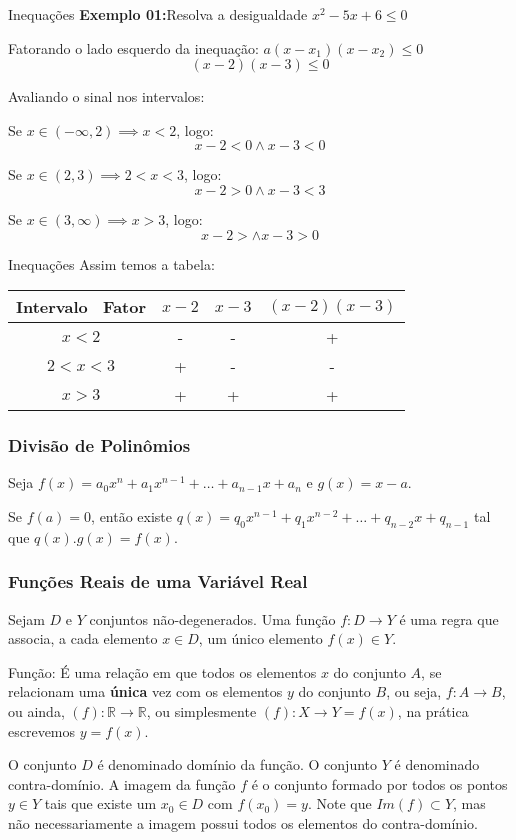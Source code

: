 \documentclass[hyperref={pdfpagelabels=false}]{beamer}
\begin{document}
\begin{frame}{Inequações}
 \textbf{Exemplo 01:}Resolva a desigualdade $x^{2} - 5x + 6 \leq 0$ \pause
 
 Fatorando o lado esquerdo da inequação: $a(x-x_1)(x-x_2) \leq 0$ 
$$(x-2)(x-3) \leq 0$$

Avaliando o sinal nos intervalos:

Se $x \in (-\infty,2) \implies x < 2$, logo:
$$x-2<0 \land x-3 < 0 $$

Se $x \in (2,3) \implies 2<x<3$, logo:
$$x-2 > 0 \land x-3 < 3$$

Se $x \in (3, \infty) \implies x > 3$, logo:
$$x - 2 > \land x - 3>0$$

\end{frame}

\begin{frame}{Inequações}
 Assim temos a tabela:
\begin{table}[h]
	\centering
	\begin{tabular}{|c|c|c|c|}
		\hline
		Intervalo \ Fator	&	$x-2$	&	$x-3$	&	$(x-2)(x-3)$ \\
		\hline
		$x<2$				&	-		&	-		&	+	\\
		\hline
		$2<x<3$				&	+		&	-		&	-	\\
		\hline
		$x>3$				&	+		&	+		&	+	\\
		\hline
	\end{tabular}
\end{table}
\end{frame}



\begin{frame}
\frametitle{Divisão de Polinômios}

Seja $f(x) = a_0x^n+a_1x^{n-1}+\dots+a_{n-1}x+a_n$ e $g(x)=x-a$. 

Se $f(a)=0$, então existe $q(x)=q_0x^{n-1}+q_1x^{n-2}+\dots+q_{n-2}x+q_{n-1}$ tal que $q(x).g(x)=f(x)$.


\end{frame}

\begin{frame}
\frametitle{Funções Reais de uma Variável Real}

Sejam $D$ e $Y$ conjuntos não-degenerados. Uma função $f:D \rightarrow Y$ é uma regra que associa, a cada elemento $x \in D$, um único elemento $f(x) \in Y$. \pause

Função: \pause É uma relação em que todos os elementos $x$ do conjunto $A$, se relacionam uma {\bf única} vez com os elementos $y$ do conjunto $B$, ou seja, $f: A \rightarrow B$, ou ainda, $(f): \mathbb{R} \rightarrow \mathbb{R}$, ou simplesmente $(f): X\rightarrow Y = f(x)$, na prática escrevemos $y = f(x)$. \pause

O conjunto $D$ é denominado domínio da função. O conjunto $Y$ é denominado contra-domínio. A imagem da função $f$ é o conjunto formado por todos os pontos $y \in Y$ tais que existe um $x_0 \in D$ com $f(x_0) = y$. Note que $Im(f) \subset Y$, mas não necessariamente a imagem possui todos os elementos do contra-domínio.
\end{frame}
\end{document}
